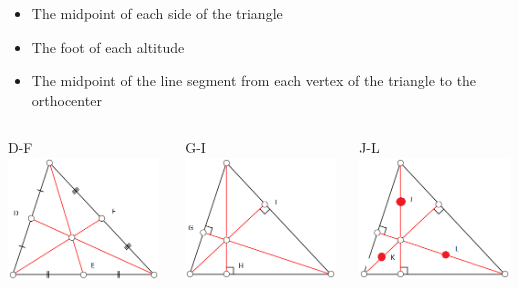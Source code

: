 \documentclass{beamer}
\begin{document}
	\begin{frame}
    		\begin{itemize}
        		\item The midpoint of each side of the triangle \cite{2}
       
        		\item The foot of each altitude \cite{3}

        		\item The midpoint of the line segment from each vertex of the triangle to the orthocenter
    		\end{itemize}

		\begin{center}
		    \begin{columns}
		        \begin{column}{3.5cm}
		            \begin{block}{D-F}
		                \includegraphics[angle=2.5, width=4cm]{median.png}
		            \end{block}
		        \end{column}
		        \pause
		        \begin{column}{3.5cm}
		            \begin{block}{G-I}
		                \includegraphics[angle=2.5, width=4cm]{altitudes.png}
		            \end{block}
		        \end{column}
		        \pause
		        \begin{column}{3.5cm}
		            \begin{block}{J-L}
		                \includegraphics[angle=2.5, width=4cm]{medialpoints.png}
		            \end{block}
		        \end{column}
		    \end{columns}
		\end{center}   
	
	    
    
	\end{frame}
\end{document}
